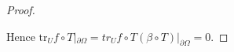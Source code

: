 \documentclass[english,a4paper,9pt,oneside]{scrbook}	%
\theoremstyle{break}
\newtheorem{prop}[equation]{Proposition}
\newtheorem{ass}[equation]{Assumption}
\newenvironment{mproof}[1][\proofname]{%
  \begin{proof}[#1]$ $\par\nobreak\ignorespaces
}{%
  \end{proof}
}
\renewcommand*{\proofname}{Proof}
\theoremstyle{remark}
\newcommand{\tr}{\text{tr}}
\newcommand{\cc}{\subset\subset}
\newcommand{\ind}[1]{\{\text{ #1 }\}}
\newcommand{\cT}{\pazocal{T}}
\begin{document}
\begin{appendices}
\begin{mproof}
Hence  $\tr_U f\circ T|_{\partial \Omega} = tr_U f\circ T(\beta \circ T)|_{\partial \Omega} = 0$.

\end{mproof}

%
%
%
%
%
%
%
%
%
%
%
%
%
%
%
%

\end{appendices}
\end{document}
